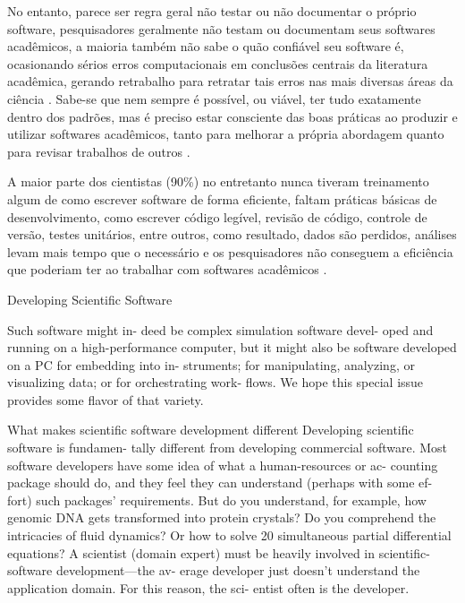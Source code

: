 No entanto, parece ser regra geral não testar ou não documentar o próprio software,
pesquisadores geralmente não testam ou documentam seus softwares acadêmicos, a
maioria também não sabe o quão confiável seu software é, ocasionando sérios
erros computacionais em conclusões centrais da literatura acadêmica, gerando
retrabalho para retratar tais erros nas mais diversas áreas da ciência
\cite{Merali2010Computational}. Sabe-se que nem sempre é possível, ou viável,
ter tudo exatamente dentro dos padrões, mas é preciso estar consciente das boas
práticas ao produzir e utilizar softwares acadêmicos, tanto para melhorar a
própria abordagem quanto para revisar trabalhos de outros
\cite{wilson2014best}.

A maior parte dos cientistas (90\%) no entretanto nunca tiveram treinamento
algum de como escrever software de forma eficiente, faltam práticas básicas de
desenvolvimento, como escrever código legível, revisão de código, controle de
versão, testes unitários, entre outros, como resultado, dados são perdidos,
análises levam mais tempo que o necessário e os pesquisadores não conseguem a
eficiência que poderiam ter ao trabalhar com softwares acadêmicos
\cite{wilson2017good}.



Developing Scientific Software

Such software might in-
deed be complex simulation software devel-
oped and running on a high-performance
computer, but it might also be software
developed on a PC for embedding into in-
struments; for manipulating, analyzing, or
visualizing data; or for orchestrating work-
flows. We hope this special issue provides
some flavor of that variety.

What makes scientific
software development different
Developing scientific software is fundamen-
tally different from developing commercial
software. Most software developers have
some idea of what a human-resources or ac-
counting package should do, and they feel
they can understand (perhaps with some ef-
fort) such packages’ requirements. But do
you understand, for example, how genomic
DNA gets transformed into protein crystals?
Do you comprehend the intricacies of fluid
dynamics? Or how to solve 20 simultaneous
partial differential equations? A scientist
(domain expert) must be heavily involved
in scientific-software development—the av-
erage developer just doesn’t understand the
application domain. For this reason, the sci-
entist often is the developer.

